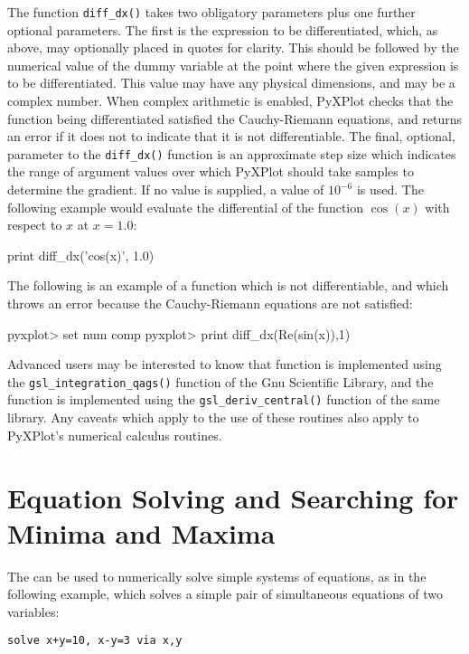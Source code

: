 The function {\tt diff\_dx()} takes two obligatory parameters plus one further
optional parameters. The first is the expression to be differentiated, which,
as above, may optionally placed in quotes for clarity. This should be followed
by the numerical value of the dummy variable at the point where the given
expression is to be differentiated. This value may have any physical
dimensions, and may be a complex number. When complex arithmetic is enabled,
PyXPlot checks that the function being differentiated satisfied the
Cauchy-Riemann equations, and returns an error if it does not to indicate that it
is not differentiable.  The final, optional, parameter to the {\tt diff\_dx()}
function is an approximate step size which indicates the range of argument
values over which PyXPlot should take samples to determine the gradient. If no
value is supplied, a value of $10^{-6}$ is used.  The following example would
evaluate the differential of the function $\cos(x)$ with respect to $x$ at
$x=1.0$:

\begin{dodo}
print diff\_dx('cos(x)', 1.0)
\end{dodo}

The following is an example of a function which is not differentiable, and
which throws an error because the Cauchy-Riemann equations are not satisfied:

\begin{dontdo}
pyxplot> set num comp
pyxplot> print diff\_dx(Re(sin(x)),1)
\end{dontdo}

Advanced users may be interested to know that  function is
implemented using the {\tt gsl\_integration\_qags()} function of the Gnu
Scientific Library, and the  function is
implemented using the {\tt gsl\_deriv\_central()} function of the same library.
Any caveats which apply to the use of these routines also apply to PyXPlot's
numerical calculus routines.

\section{Equation Solving and Searching for Minima and Maxima}

The  can be used to numerically solve simple systems of
equations, as in the following example, which solves a simple pair of
simultaneous equations of two variables:

\begin{verbatim}
solve x+y=10, x-y=3 via x,y
\end{verbatim}

